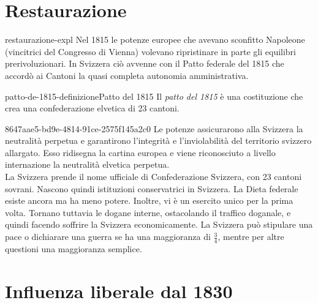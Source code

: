 \documentclass[preview]{standalone}
\begin{document}
\section{Restaurazione}

\begin{snippet}{restaurazione-expl}
    Nel 1815 le potenze europee che avevano sconfitto Napoleone (vincitrici del Congresso di Vienna)
    volevano ripristinare in parte gli equilibri prerivoluzionari.
    In Svizzera ciò avvenne con il Patto federale del 1815 che
    accordò ai Cantoni la quasi completa autonomia amministrativa.
\end{snippet}

\begin{snippetdefinition}{patto-de-1815-definizione}{Patto del 1815}
    Il \textit{patto del 1815} è una costituzione che crea una confederazione elvetica di 23 cantoni.
\end{snippetdefinition}

\begin{snippet}{8647aae5-bd9e-4814-91ce-2575f145a2c0}
    Le potenze assicurarono alla Svizzera la neutralità perpetua e garantirono
    l'integrità e l'inviolabilità del territorio svizzero allargato.
    Esso ridisegna la cartina europea e viene riconosciuto a livello internazione la neutralità elvetica perpetua.
    \\
    La Svizzera prende il nome ufficiale di Confederazione Svizzera, con 23 cantoni sovrani.
    Nascono quindi istituzioni conservatrici in Svizzera.
    La Dieta federale esiste ancora ma ha meno potere.
    Inoltre, vi è un esercito unico per la prima volta.
    Tornano tuttavia le dogane interne, ostacolando il traffico doganale, e quindi facendo
    soffrire la Svizzera economicamente.
    La Svizzera può stipulare una pace o dichiarare una guerra se ha una maggioranza di \(\frac{3}{4}\),
    mentre per altre questioni una maggioranza semplice.
\end{snippet}

\section{Influenza liberale dal 1830}
\end{document}
